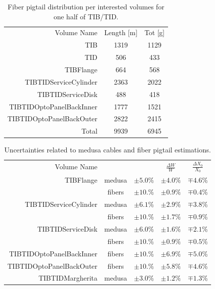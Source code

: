 \begin{table}[h!]
  \caption{Fiber pigtail distribution per interested volumes for one half of TIB/TID.}
  \label{tab:pigtail}
  \begin{center}
    \begin{tabular}{rcc}
Volume Name              & Length [m]  & Tot [g] \\ 
TIB                      & 1319 & 1129\\
TID                      & 506  &  433\\
TIBFlange                & 664  &  568\\
TIBTIDServiceCylinder    & 2363 & 2022\\
TIBTIDServiceDisk        & 488  &  418\\
TIBTIDOptoPanelBackInner & 1777 & 1521\\
TIBTIDOptoPanelBackOuter & 2822 & 2415\\
Total	                 & 9939 & 6945\\
    \end{tabular}
  \end{center}
\end{table}

\begin{table}[h!]
  \caption{Uncertainties related to medusa cables and fiber pigtail estimations.}
  \label{tab:unc}
  \begin{center}
    \begin{tabular}{rcccc}
Volume Name   &            &  & $\frac{\Delta W}{W}$ & $\frac{\Delta X_0}{X_0}$ \\ 
TIBFlange   & medusa  & $\pm 5.0\%$  &  $\pm 4.0\%$ & $\mp 4.6 \%$ \\
                     & fibers       & $\pm 10.\%$  &  $\pm 0.9 \%$ & $\mp 0.4 \%$ \\
TIBTIDServiceCylinder  & medusa &  $\pm 6.1\%$  &  $\pm 2.9\%$ & $\mp 3.8 \%$ \\
                                           & fibers      & $\pm 10.\%$  &  $\pm 1.7\%$ & $\mp 0.9 \%$ \\
TIBTIDServiceDisk  & medusa     &  $\pm 6.0\%$  &  $\pm 1.6\%$ & $\mp 2.1 \%$ \\
                                    & fibers    &  $\pm 10.\%$  &  $\pm 0.9\%$ & $\mp 0.5 \%$ \\
TIBTIDOptoPanelBackInner & fibers &  $\pm 10.\%$  &  $\pm 6.9\%$ & $\mp 5.0 \%$ \\
TIBTIDOptoPanelBackOuter & fibers &  $\pm 10.\%$  &  $\pm 5.8\%$ & $\mp 4.6 \%$ \\
TIBTIDMargherita  & medusa    &  $\pm 3.0\%$  &  $\pm 1.2\%$ & $\mp 1.3 \%$ \\
    \end{tabular}
  \end{center}
\end{table}

